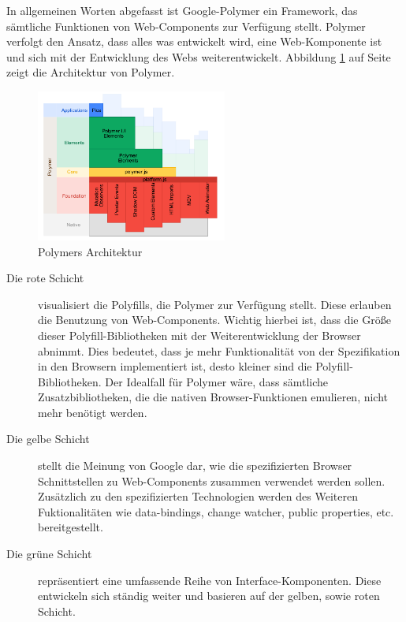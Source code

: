 
In allgemeinen Worten abgefasst ist Google-Polymer ein Framework, das sämtliche Funktionen von Web-Components zur Verfügung stellt. Polymer verfolgt den Ansatz, dass alles was entwickelt wird, eine Web-Komponente ist und sich mit der Entwicklung des Webs weiterentwickelt. Abbildung \ref{fig:3_polymer_architecture} auf Seite \pageref{fig:3_polymer_architecture} zeigt die Architektur von Polymer.


\begin{figure}[h]
\centering
\includegraphics[height=5.0cm]{images/polymer_architecture.png}
\caption[
Polymers Architektur, Urldate: 04.2014 \newline
\small\texttt{http://www.polymer-project.org/images/architecture-diagram.svg}
]{Polymers Architektur}
\label{fig:3_polymer_architecture}
\end{figure}

\begin{description}
\item[Die rote Schicht] visualisiert die Polyfills, die Polymer zur Verfügung stellt. Diese erlauben die Benutzung von Web-Components. Wichtig hierbei ist, dass die Größe dieser Polyfill-Bibliotheken mit der Weiterentwicklung der Browser abnimmt. Dies bedeutet, dass je mehr Funktionalität von der Spezifikation in den Browsern implementiert ist, desto kleiner sind die Polyfill-Bibliotheken. Der Idealfall für Polymer wäre, dass sämtliche Zusatzbibliotheken, die die nativen Browser-Funktionen emulieren, nicht mehr benötigt werden.
\item[Die gelbe Schicht] stellt die Meinung von Google dar, wie die spezifizierten Browser Schnittstellen zu Web-Components zusammen verwendet werden sollen. Zusätzlich zu den spezifizierten Technologien werden des Weiteren Fuktionalitäten wie \glqq data-bindings\grqq , \glqq change watcher\grqq , \glqq public properties\grqq , etc. bereitgestellt.
\item[Die grüne Schicht] repräsentiert eine umfassende Reihe von Interface-Komponenten. Diese entwickeln sich ständig weiter und basieren auf der gelben, sowie roten Schicht.
\end{description}

